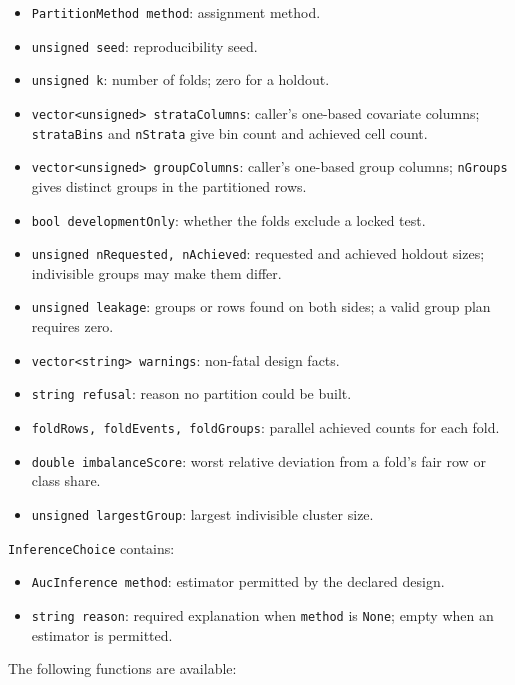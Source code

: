 \begin{itemize}
\item \texttt{PartitionMethod method}: assignment method.
\item \texttt{unsigned seed}: reproducibility seed.
\item \texttt{unsigned k}: number of folds; zero for a holdout.
\item \texttt{vector<unsigned> strataColumns}: caller's one-based covariate
      columns; \texttt{strataBins} and \texttt{nStrata} give bin count and
      achieved cell count.
\item \texttt{vector<unsigned> groupColumns}: caller's one-based group columns;
      \texttt{nGroups} gives distinct groups in the partitioned rows.
\item \texttt{bool developmentOnly}: whether the folds exclude a locked test.
\item \texttt{unsigned nRequested, nAchieved}: requested and achieved holdout
      sizes; indivisible groups may make them differ.
\item \texttt{unsigned leakage}: groups or rows found on both sides; a valid
      group plan requires zero.
\item \texttt{vector<string> warnings}: non-fatal design facts.
\item \texttt{string refusal}: reason no partition could be built.
\item \texttt{foldRows, foldEvents, foldGroups}: parallel achieved counts for
      each fold.
\item \texttt{double imbalanceScore}: worst relative deviation from a fold's
      fair row or class share.
\item \texttt{unsigned largestGroup}: largest indivisible cluster size.
\end{itemize}

\texttt{InferenceChoice} contains:

\begin{itemize}
\item \texttt{AucInference method}: estimator permitted by the declared design.
\item \texttt{string reason}: required explanation when \texttt{method} is
      \texttt{None}; empty when an estimator is permitted.
\end{itemize}

The following functions are available:

